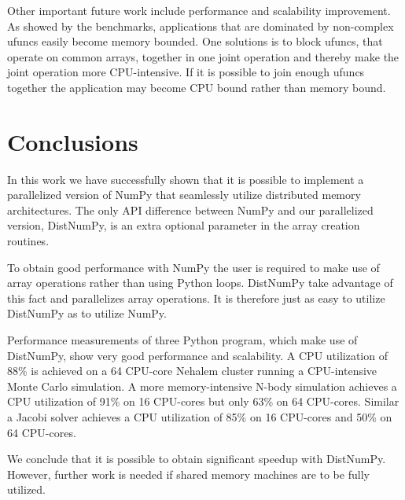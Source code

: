 \documentclass[10pt]{article}
\begin{document}
Other important future work include performance and scalability improvement. As showed by the benchmarks, applications that are dominated by non-complex ufuncs easily become memory bounded. One solutions is to block ufuncs, that operate on common arrays, together in one joint operation and thereby make the joint operation more CPU-intensive. If it is possible to join enough ufuncs together the application may become CPU bound rather than memory bound.



\section{Conclusions}
In this work we have successfully shown that it is possible to implement a parallelized version of NumPy\cite{numpy} that seamlessly utilize distributed memory architectures. The only API difference between NumPy and our parallelized version, DistNumPy, is an extra optional parameter in the array creation routines.

To obtain good performance with NumPy the user is required to make use of array operations rather than using Python loops. DistNumPy take advantage of this fact and parallelizes array operations. It is therefore just as easy to utilize DistNumPy as to utilize NumPy.

Performance measurements of three Python program, which make use of DistNumPy, show very good performance and scalability. A CPU utilization of 88\% is achieved on a 64 CPU-core Nehalem cluster running a CPU-intensive Monte Carlo simulation. A more memory-intensive N-body simulation achieves a CPU utilization of 91\% on 16 CPU-cores but only 63\% on 64 CPU-cores. Similar a Jacobi solver achieves a CPU utilization of 85\% on 16 CPU-cores and 50\% on 64 CPU-cores.

We conclude that it is possible to obtain significant speedup with DistNumPy. However, further work is needed if shared memory machines are to be fully utilized. 





%


\end{document}
